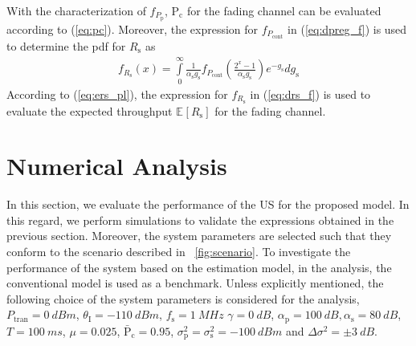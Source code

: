 \documentclass[conference, twocolumn]{IEEEtran}
\newcommand{\e}[2]{{\mathbb E}_{#1}\left[ #2 \right]}
\newcommand{\sub}[1]{_{\text{#1}}}
\newcommand{\pc}{\text{P}\sub{c}}
\newcommand{\pcd}{\bar{\text{P}}\sub{c}}
\newcommand{\preg}{P\sub{cont}}
\newcommand{\ptran}{P\sub{tran}}
\newcommand{\pp}{P\sub{p}}
\newcommand{\ite}{\theta\sub{I}}
\newcommand{\rs}{R\sub{s}}
\newcommand{\ers}{\e{}{\rs}}
\newcommand{\gs}{g\sub{s}}
\newcommand{\ap}{\alpha\sub{p}}
\newcommand{\as}{\alpha\sub{s}}
\newcommand{\npp}{\sigma^2\sub{p}}
\newcommand{\nps}{\sigma^2\sub{s}}
\newcommand{\npu}{\Delta\sigma^2}
\newcommand{\fsam}{f\sub{s}}
\newcommand{\dpp}{f_{\pp}}
\newcommand{\dpreg}{f_{\preg}}
\newcommand{\drs}{f_{\rs}}
\begin{document}
With the characterization of $\dpp$, $\pc$ for the fading channel can be evaluated according to (\ref{eq:pc}). Moreover, the expression for $\dpreg$ in (\ref{eq:dpreg_f}) is used to determine the pdf for $\rs$ as
\begin{align}
\drs(x) = \int\limits_{0}^{\infty} \frac{1}{\as \gs} \dpreg\left( \frac{2^x - 1}{\as \gs} \right) e^{-\gs} d\gs
\label{eq:drs_f}
\end{align} 
According to (\ref{eq:ers_pl}), the expression for $\drs$ in (\ref{eq:drs_f}) is used to evaluate the expected throughput $\ers$ for the fading channel. 
 
\section{Numerical Analysis} \label{sec:num_ana}
In this section, we evaluate the performance of the US for the proposed model. In this regard, we perform simulations to validate the expressions obtained in the previous section. Moreover, the system parameters are selected such that they conform to the scenario described in \figurename~\ref{fig:scenario}. To investigate the performance of the system based on the estimation model, in the analysis, the conventional model is used as a benchmark. 
Unless explicitly mentioned, the following choice of the system parameters is considered for the analysis, $\ptran = \SI{0}{dBm}$, $\ite = -\SI{110}{dBm}$, $\fsam = \SI{1}{MHz}$ $\gamma = \SI{0}{dB}$, $\ap = \SI{100}{dB}, \as = \SI{80}{dB}$, $T = \SI{100}{ms}$, $\mu = 0.025$, $\pcd = 0.95$, $\npp = \nps = \SI{-100}{dBm}$ and $\npu = \pm \SI{3}{dB}$. 
\end{document}
